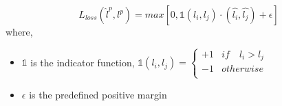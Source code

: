 \begin{equation}
    \label{equation:learning_loss_pair_wise_loss}
    L_{loss}(\hat{l}^{p}, l^{p}) = max [0, \mathbb{1}(l_i, l_j)\cdot(\hat{l_i}, \hat{l_j}) + \epsilon ]
\end{equation}
where,
\begin{itemize}[label={}]
  \setlength\itemsep{0em}
  \item $\mathbb{1}$ is the indicator function, $\mathbb{1}(l_i, l_j) = \begin{cases} 
      +1 & if \quad l_i > l_j \\
      -1 & otherwise \\
   \end{cases}$
   \item $\epsilon$ is the predefined positive margin
\end{itemize}

